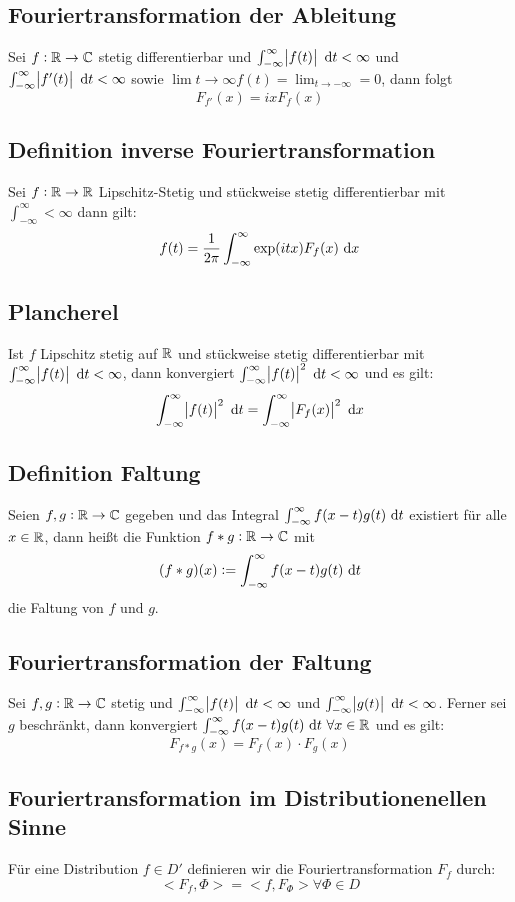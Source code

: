 \subsection{Fouriertransformation der Ableitung}
Sei $f: \mathbb{R} \to \mathbb{C}$ stetig differentierbar und $\int_{-\infty}^\infty \abs{f(t)} \text{ d}t < \infty$ und
$\int_{-\infty}^\infty \abs{f'(t)} \text{ d}t < \infty$ sowie $\lim{t \to \infty} f(t) = \lim_{t \to - \infty} = 0$, dann
folgt
\begin{equation*}
    F_{f'} (x) = ixF_f(x)
\end{equation*}

\subsection{Definition inverse Fouriertransformation}
Sei $f: \mathbb{R} \to \mathbb{R}$ Lipschitz-Stetig und stückweise stetig differentierbar mit $\int_{-\infty}^\infty < \infty$
dann gilt:
\begin{equation*}
    f(t) = \frac{1}{2\pi} \int_{-\infty}^\infty \exp(itx) F_f(x) \text{ d}x
\end{equation*}

\subsection{Plancherel}
Ist $f$ Lipschitz stetig auf $\mathbb{R}$ und stückweise stetig differentierbar mit $\int_{-\infty}^\infty \abs{f(t)} \text{ d}t
<\infty$, dann konvergiert $\int_{-\infty}^\infty \abs{f(t)}^2 \text{ d}t < \infty$ und es gilt:
\begin{equation*}
    \int_{-\infty}^\infty \abs{f(t)}^2 \text{ d}t = \int_{-\infty}^\infty \abs{F_f(x)}^2 \text{ d}x
\end{equation*}

\subsection{Definition Faltung}
Seien $f,g: \mathbb{R} \to \mathbb{C}$ gegeben und das Integral $\int_{-\infty}^\infty f(x-t) g(t) \text{ d}t$ existiert für alle
$x \in \mathbb{R}$, dann heißt die Funktion $f * g: \mathbb{R} \to \mathbb{C}$ mit
\begin{equation*}
    (f*g)(x) := \int_{-\infty}^\infty f(x-t)g(t) \text{ d}t
\end{equation*}
die Faltung von $f$ und $g$.

\subsection{Fouriertransformation der Faltung}
Sei $f,g: \mathbb{R} \to \mathbb{C}$ stetig und $\int_{-\infty}^\infty \abs{f(t)} \text{ d}t < \infty$ und 
$\int_{-\infty}^\infty \abs{g(t)} \text{ d}t < \infty$. Ferner sei $g$ beschränkt, dann konvergiert
$\int_{-\infty}^\infty f(x-t)g(t) \text{ d}t\ \forall x \in \mathbb{R}$ und es gilt: 
\begin{equation*}
    F_{f*g}(x) = F_f(x) \cdot F_g(x)
\end{equation*}

\subsection{Fouriertransformation im Distributionenellen Sinne}
Für eine Distribution $f \in D'$ definieren wir die Fouriertransformation $F_f$ durch:
\begin{equation*}
    <F_f, \Phi> = <f, F_\Phi> \forall \Phi \in D
\end{equation*}
